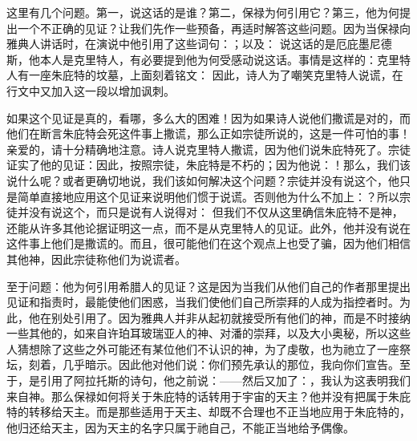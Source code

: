 \par

\par

这里有几个问题。第一，说这话的是谁？第二，保禄为何引用它？第三，他为何提出一个不正确的见证？让我们先作一些预备，再适时解答这些问题。因为当保禄向雅典人讲话时，在演说中他引用了这些词句：；以及：  说这话的是厄庇墨尼德斯，他本人是克里特人，有必要提到他为何受感动说这话。事情是这样的：克里特人有一座朱庇特的坟墓，上面刻着铭文： 因此，诗人为了嘲笑克里特人说谎，在行文中又加入这一段以增加讽刺。\par

\par

如果这个见证是真的，看哪，多么大的困难！因为如果诗人说他们撒谎是对的，而他们在断言朱庇特会死这件事上撒谎，那么正如宗徒所说的，这是一件可怕的事！亲爱的，请十分精确地注意。诗人说克里特人撒谎，因为他们说朱庇特死了。宗徒证实了他的见证：因此，按照宗徒，朱庇特是不朽的；因为他说：！那么，我们该说什么呢？或者更确切地说，我们该如何解决这个问题？宗徒并没有说这个，他只是简单直接地应用这个见证来说明他们惯于说谎。否则他为什么不加上：？所以宗徒并没有说这个，而只是说有人说得对： 但我们不仅从这里确信朱庇特不是神，还能从许多其他论据证明这一点，而不是从克里特人的见证。此外，他并没有说在这件事上他们是撒谎的。而且，很可能他们在这个观点上也受了骗，因为他们相信其他神，因此宗徒称他们为说谎者。\par

至于问题：他为何引用希腊人的见证？这是因为当我们从他们自己的作者那里提出见证和指责时，最能使他们困惑，当我们使他们自己所崇拜的人成为指控者时。为此，他在别处引用了。因为雅典人并非从起初就接受所有他们的神，而是不时接纳一些其他的，如来自许珀耳玻瑞亚人的神、对潘的崇拜，以及大小奥秘，所以这些人猜想除了这些之外可能还有某位他们不认识的神，为了虔敬，也为祂立了一座祭坛，刻着，几乎暗示。因此他对他们说：你们预先承认的那位，我向你们宣告。至于，是引用了阿拉托斯的诗句，他之前说：——然后又加了：，我认为这表明我们来自神。那么保禄如何将关于朱庇特的话转用于宇宙的天主？他并没有把属于朱庇特的转移给天主。而是那些适用于天主、却既不合理也不正当地应用于朱庇特的，他归还给天主，因为天主的名字只属于祂自己，不能正当地给予偶像。\par

